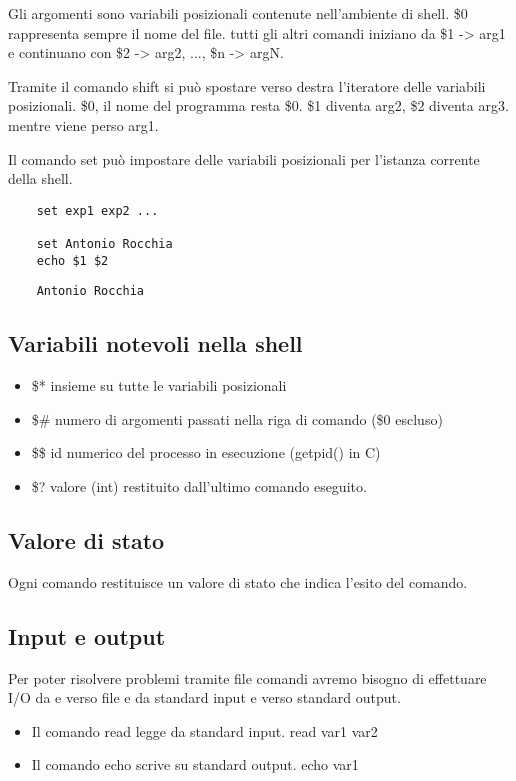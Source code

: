 \documentclass
[10pt,        %
 a4paper,     %
 onecolumn,   %
 fleqn,       %
 oneside,     %
 notitlepage, %
 openany      %
]{article}    %
\begin{document}
Gli argomenti sono variabili posizionali contenute nell'ambiente di shell.
\$0 rappresenta sempre il nome del file. tutti gli altri comandi iniziano da \$1 -> arg1 e continuano con \$2 -> arg2, ..., \$n -> argN.

Tramite il comando shift si può spostare verso destra l'iteratore delle variabili posizionali. \$0, il nome del programma resta \$0. \$1 diventa arg2, \$2 diventa arg3. mentre viene perso arg1.

Il comando set può impostare delle variabili posizionali per l'istanza corrente della shell.
\begin{lstlisting}
    set exp1 exp2 ...

    set Antonio Rocchia
    echo $1 $2
\end{lstlisting}

\begin{lstlisting}
    Antonio Rocchia
\end{lstlisting}

\subsection{Variabili notevoli nella shell}
\begin{itemize}
\item \$* insieme su tutte le variabili posizionali
\item \$\# numero di argomenti passati nella riga di comando (\$0 escluso)
\item \$\$ id numerico del processo in esecuzione (getpid() in C)
\item \$? valore (int) restituito dall'ultimo comando eseguito.
\end{itemize}

\subsection{Valore di stato}
Ogni comando restituisce un valore di stato che indica l'esito del comando.

\subsection{Input e output}
Per poter risolvere problemi tramite file comandi avremo bisogno di effettuare I/O da e verso file e da standard input e verso standard output.

\begin{itemize}
\item Il comando read legge da standard input. read var1 var2
\item Il comando echo scrive su standard output. echo var1
\end{itemize}
\end{document}
